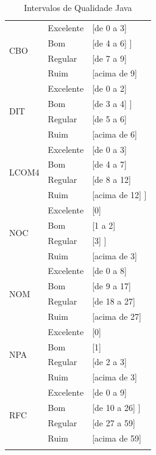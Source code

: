 \begin{longtable}{|l|l|l|}
		 \multirow{4}{*}{CBO} 
		 & Excelente & [de 0 a 3]  \\
		 & Bom & [de 4 a 6] ] \\
		 & Regular & [de 7 a 9]  \\
		 & Ruim & [acima de 9] \\ \hline

		 \multirow{4}{*}{DIT} 
		 & Excelente & [de 0 a 2]   \\
		 & Bom & [de 3 a 4]  ] \\
		 & Regular & [de 5 a 6]   \\
		 & Ruim & [acima de 6]  \\ \hline

		 \multirow{4}{*}{LCOM4} 
		 & Excelente & [de 0 a 3]  \\
		 & Bom & [de 4 a 7]  \\
		 & Regular & [de 8 a 12]   \\
		 & Ruim & [acima de 12]  ] \\ \hline



		 \multirow{4}{*}{NOC} 
		 & Excelente & [0]  \\
		 & Bom & [1 a 2]   \\
		 & Regular & [3]  ] \\
		 & Ruim & [acima de 3]   \\ \hline



		 \multirow{4}{*}{NOM} 
		 & Excelente & [de 0 a 8]   \\
		 & Bom & [de 9 a 17]   \\
		 & Regular & [de 18 a 27]  \\
		 & Ruim & [acima de 27]   \\ \hline




		 \multirow{4}{*}{NPA} 
		 & Excelente & [0]   \\
		 & Bom & [1]   \\
		 & Regular & [de 2 a 3]   \\
		 & Ruim & [acima de 3]  \\ \hline


		 \multirow{4}{*}{RFC} 
		 & Excelente & [de 0 a 9]   \\
		 & Bom & [de 10 a 26]  ] \\
		 & Regular & [de 27 a 59]   \\
		 & Ruim & [acima de 59]   \\ \hline
 	

			\caption{Intervalos de Qualidade Java}
\label{intervalos}
	\end{longtable}

